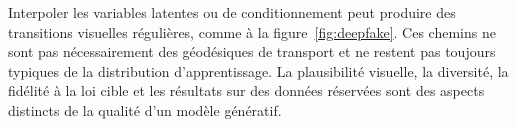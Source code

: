 Interpoler les variables latentes ou de conditionnement peut produire des transitions visuelles régulières, comme à la figure~\ref{fig:deepfake}. Ces chemins ne sont pas nécessairement des géodésiques de transport et ne restent pas toujours typiques de la distribution d'apprentissage. La plausibilité visuelle, la diversité, la fidélité à la loi cible et les résultats sur des données réservées sont des aspects distincts de la qualité d'un modèle génératif.
